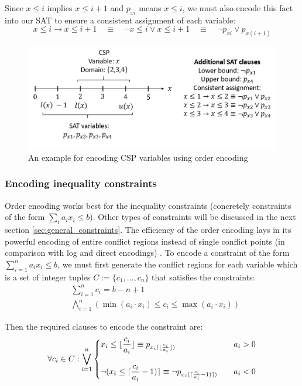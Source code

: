 Since $x \leq i$ implies $x \leq i+1$ and $p_{xi}$ means $x \leq i$, we must also encode this fact into our SAT to ensure a consistent assignment of each variable:
$$
x \leq i \rightarrow x \leq i + 1 \quad \equiv \quad
\neg x \leq i \vee x \leq i + 1 \quad \equiv \quad
\neg p_{xi} \vee p_{x(i+1)}
$$

\begin{figure}[H]
	\centering
	\includegraphics[width=0.7\linewidth]{assets/order_encoding_variables}
	\captionsetup{justification=centering,margin=2cm}
	\caption{An example for encoding CSP variables using order encoding}
	\label{fig:order_encoding_variables}
\end{figure}

\subsubsection{Encoding inequality constraints}
Order encoding works best for the inequality constraints (concretely constraints of the form $\sum_i a_i x_i \leq b$). Other types of constraints will be discussed in the next section \ref{sec:general_constraints}. The efficiency of the order encoding lays in its powerful encoding of entire conflict regions instead of single conflict points (in comparison with log and direct encodings) \cite{tamura2008sugar}. To encode a constraint of the form $\sum_{i=1}^n a_i x_i \leq b$, we must first generate the conflict regions for each variable which is a set of integer tuples $C := \{c_1, \dots, c_n \}$ that satisfies the constraints: 
\begin{align}
	&\sum_{i=1}^n c_i = b - n + 1 \\
	&\bigwedge_{i=1}^n (\min(a_i \cdot x_i) \leq c_i \leq \max(a_i \cdot x_i))
\end{align}

Then the required clauses to encode the constraint are:
\begin{equation}
\forall c_i \in C: \bigvee_{i=1}^n 
\begin{dcases}
	x_i \leq \lfloor \frac{c_i}{a_i} \rfloor \equiv
	 p_{x_i (\lfloor \frac{c_i}{a_i} \rfloor)} &\quad a_i > 0 \\[10pt]
	\neg (x_i \leq \lceil \frac{c_i}{a_i} - 1) \rceil \equiv
	 \neg p_{x_i (\lceil \frac{c_i}{a_i} - 1) \rceil)} &\quad a_i < 0 
\end{dcases}
\end{equation}

